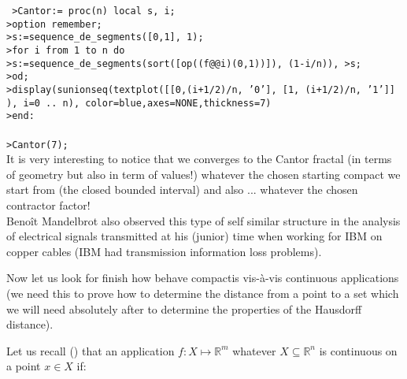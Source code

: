 	\pagebreak
	\begin{tcolorbox}[colframe=black,colback=white,sharp corners]
	\texttt{
	>Cantor:= proc(n) local s, i;\\
	>option remember;\\
	>s:=sequence\_de\_segments([0,1], 1);\\
	>for i from 1 to n do\\
	>s:=sequence\_de\_segments(sort([op((f@@i)({0,1}))]), (1-i/n)), 
	>s;\\
	>od;\\
	>display({s}union{seq(textplot([[0,(i+1/2)/n, '0'], [1, (i+1/2)/n, '1']] \\
	), i=0 .. n)}, color=blue,axes=NONE,thickness=7)\\
	>end:\\\\
	>Cantor(7);
	}\\
	
	It is very interesting to notice that we converges to the Cantor fractal (in terms of geometry but also in term of values!) whatever the chosen starting compact we start from (the closed bounded interval) and also ... whatever the chosen contractor factor!\\
	
	Benoît Mandelbrot also observed this type of self similar structure in the analysis of electrical signals transmitted at his (junior) time when working for IBM on copper cables (IBM had transmission information loss problems).
	\end{tcolorbox}
	Now let us look for finish how behave compactis vis-à-vis continuous applications (we need this to prove how to determine the distance from a point to a set which we will need absolutely after to determine the properties of the Hausdorff distance).
	
	Let us recall () that an application $f:X \mapsto \mathbb{R}^m$ whatever $X \subseteq \mathbb{R}^n$  is continuous on a point $x\in X$ if:
	
